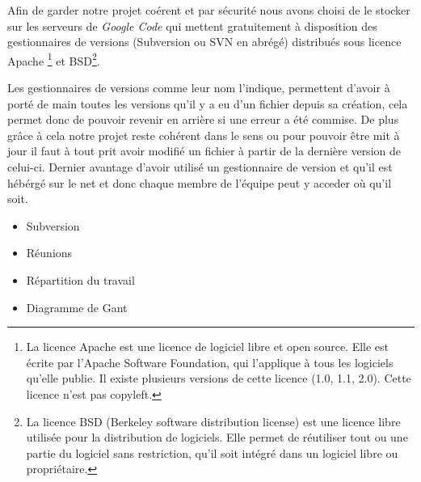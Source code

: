 		Afin de garder notre projet coérent et par sécurité nous avons choisi de le
		stocker sur les serveurs de \emph{Google Code} qui mettent gratuitement à
		disposition des gestionnaires de versions (Subversion ou SVN en abrégé)
		distribués sous licence Apache  \footnote{La licence Apache est une licence 
		de logiciel libre et open source. Elle est écrite par l'Apache Software
		Foundation,  qui l'applique à tous les logiciels qu'elle publie. Il existe
		plusieurs versions de cette licence (1.0, 1.1, 2.0). Cette licence n'est pas
		copyleft.} et BSD\footnote{La licence BSD (Berkeley software distribution
		license) est une licence libre utilisée pour la distribution de logiciels.
		Elle permet de réutiliser tout ou une partie du logiciel sans restriction,
		qu'il soit intégré dans un logiciel libre ou propriétaire.}.
		
		Les gestionnaires de versions comme leur nom l'indique, permettent d'avoir à
		porté de main toutes les versions qu'il y a eu d'un fichier depuis sa
		création, cela permet donc de pouvoir revenir en arrière si une erreur a été commise.
		De plus grâce à cela notre projet reste cohérent dans le sens ou pour pouvoir
		être mit à jour il faut à tout prit avoir modifié un fichier à partir de la
		dernière version de celui-ci.
		Dernier avantage d'avoir utilisé un gestionnaire de version et qu'il est
		hébérgé sur le net et donc chaque membre de l'équipe peut y acceder où qu'il
		soit.

\begin{itemize}
  
	\item{Subversion}	
	\item{Réunions}
	\item{Répartition du travail}
	\item{Diagramme de Gant}
\end{itemize}